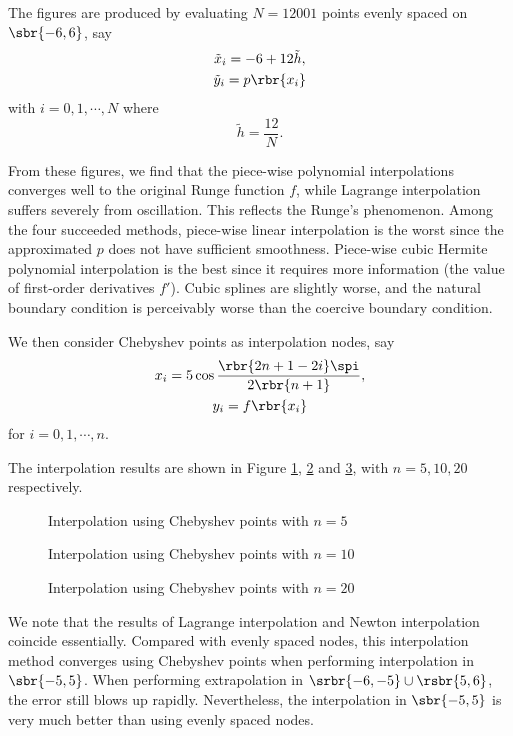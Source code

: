 \documentclass[english, nochinese]{pnote}
\begin{document}
The figures are produced by evaluating $ N = 12001 $ points evenly spaced on $ \sbr{ -6, 6 } $, say
\begin{gather}
\tilde{x}_i = -6 + 12 \tilde{h}, \\
\tilde{y}_i = p \rbr{x_i}
\end{gather}
with $ i = 0, 1, \cdots, N $ where
\begin{equation}
\tilde{h} = \frac{12}{N}.
\end{equation}

From these figures, we find that the piece-wise polynomial interpolations converges well to the original Runge function $f$, while Lagrange interpolation suffers severely from oscillation. This reflects the Runge's phenomenon. Among the four succeeded methods, piece-wise linear interpolation is the worst since the approximated $p$ does not have sufficient smoothness. Piece-wise cubic Hermite polynomial interpolation is the best since it requires more information (the value of first-order derivatives $f'$). Cubic splines are slightly worse, and the natural boundary condition is perceivably worse than the coercive boundary condition.

We then consider Chebyshev points as interpolation nodes, say
\begin{gather}
x_i = 5 \cos \frac{ \rbr{ 2 n + 1 - 2 i } \spi }{ 2 \rbr{ n + 1 } }, \\
y_i = f \rbr{x_i}
\end{gather}
for $ i = 0, 1, \cdots, n $.


The interpolation results are shown in Figure \ref{Fig:Cheb5}, \ref{Fig:Cheb10} and \ref{Fig:Cheb20}, with $ n = 5, 10, 20 $ respectively.

\begin{figure}
\centering
\scalebox{0.7}{}
\caption{Interpolation using Chebyshev points with $ n = 5 $}
\label{Fig:Cheb5}
\end{figure}

\begin{figure}
\centering
\scalebox{0.7}{}
\caption{Interpolation using Chebyshev points with $ n = 10 $}
\label{Fig:Cheb10}
\end{figure}

\begin{figure}
\centering
\scalebox{0.7}{}
\caption{Interpolation using Chebyshev points with $ n = 20 $}
\label{Fig:Cheb20}
\end{figure}

We note that the results of Lagrange interpolation and Newton interpolation coincide essentially. Compared with evenly spaced nodes, this interpolation method converges using Chebyshev points when performing interpolation in $ \sbr{ -5, 5 } $. When performing extrapolation in $ \srbr{ -6, -5 } \cup \rsbr{ 5, 6 } $, the error still blows up rapidly. Nevertheless, the interpolation in $ \sbr{ -5, 5 } $ is very much better than using evenly spaced nodes.
\end{document}
